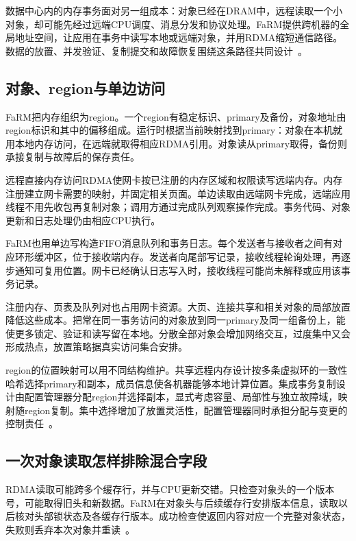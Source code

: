 数据中心内的内存事务面对另一组成本：对象已经在DRAM中，远程读取一个小对象，却可能先经过远端CPU调度、消息分发和协议处理。FaRM提供跨机器的全局地址空间，让应用在事务中读写本地或远端对象，并用RDMA缩短通信路径。数据的放置、并发验证、复制提交和故障恢复围绕这条路径共同设计~\cite{farm2014,farm2015}。

\subsection{对象、region与单边访问}

FaRM把内存组织为region。一个region有稳定标识、primary及备份，对象地址由region标识和其中的偏移组成。运行时根据当前映射找到primary：对象在本机就用本地内存访问，在远端就取得相应RDMA引用。对象读从primary取得，备份则承接复制与故障后的保存责任。

远程直接内存访问RDMA使网卡按已注册的内存区域和权限读写远端内存。内存注册建立网卡需要的映射，并固定相关页面。单边读取由远端网卡完成，远端应用线程不用先收包再复制对象；调用方通过完成队列观察操作完成。事务代码、对象更新和日志处理仍由相应CPU执行。


FaRM也用单边写构造FIFO消息队列和事务日志。每个发送者与接收者之间有对应环形缓冲区，位于接收端内存。发送者向尾部写记录，接收线程轮询处理，再逐步通知可复用位置。网卡已经确认日志写入时，接收线程可能尚未解释或应用该事务记录。

注册内存、页表及队列对也占用网卡资源。大页、连接共享和相关对象的局部放置降低这些成本。把常在同一事务访问的对象放到同一primary及同一组备份上，能使更多锁定、验证和读写留在本地。分散全部对象会增加网络交互，过度集中又会形成热点，放置策略据真实访问集合安排。

region的位置映射可以用不同结构维护。共享远程内存设计按多条虚拟环的一致性哈希选择primary和副本，成员信息使各机器能够本地计算位置。集成事务复制设计由配置管理器分配region并选择副本，显式考虑容量、局部性与独立故障域，映射随region复制。集中选择增加了放置灵活性，配置管理器同时承担分配与变更的控制责任~\cite{farm2014,farm2015}。

\subsection{一次对象读取怎样排除混合字段}

RDMA读取可能跨多个缓存行，并与CPU更新交错。只检查对象头的一个版本号，可能取得旧头和新数据。FaRM在对象头与后续缓存行安排版本信息，读取以后核对头部锁状态及各缓存行版本。成功检查使返回内容对应一个完整对象状态，失败则丢弃本次对象并重读~\cite{farm2014}。


